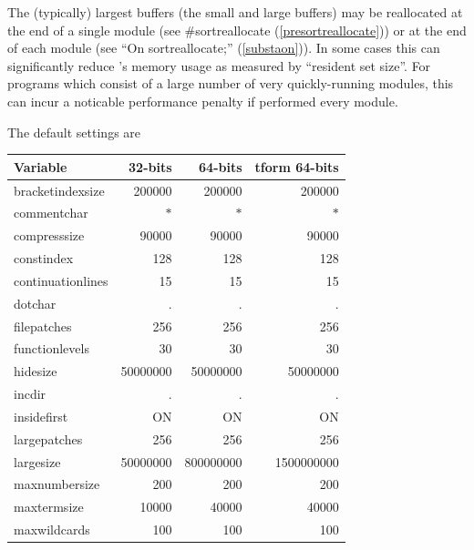 The (typically) largest buffers (the small and large buffers) may be reallocated
at the end of a single module (see \#sortreallocate (\ref{presortreallocate})) or
at the end of each module (see ``On sortreallocate;'' (\ref{substaon})). In some
cases this can significantly reduce \FORM's memory usage as measured by
``resident set size''. For programs which consist of a large number of very
quickly-running modules, this can incur a noticable performance penalty if performed
every module.

The default settings are
\begin{center}
\begin{tabular}{lrrr}
Variable         &      32-bits       &    64-bits  & tform 64-bits   \\ \hline
bracketindexsize &      200000        & 200000      & 200000       \\
commentchar &           $*$           & $*$         & $*$          \\
compresssize &          90000         & 90000       & 90000        \\
constindex &            128           & 128         & 128          \\
continuationlines &     15            & 15          & 15           \\
dotchar &               .             & .           & .            \\
filepatches &           256           & 256         & 256          \\
functionlevels &        30            & 30          & 30           \\
hidesize &              50000000      & 50000000    & 50000000     \\
incdir &                .             & .           & .            \\
insidefirst &           ON            & ON          & ON           \\
largepatches &          256           & 256         & 256          \\
largesize &             50000000      & 800000000   & 1500000000   \\
maxnumbersize &         200           & 200         & 200          \\
maxtermsize &           10000         & 40000       & 40000        \\
maxwildcards &          100           & 100         & 100          \\

\end{tabular}
\end{center}
